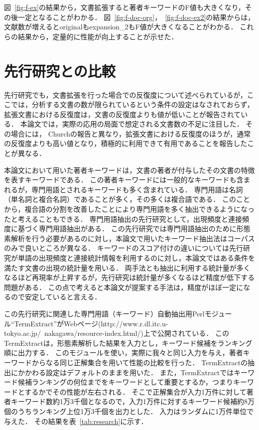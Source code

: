 \documentclass[japanese]{jnlp_1.2c}
\begin{document}
図~\ref{fig:f-ex}の結果から，文書拡張すると著者キーワードのF値も大きくなり，その後一定となることがわかる．
図~\ref{fig:f-doc-org}，~\ref{fig:f-doc-ex2}の結果からは，文献数が増えるとoriginalもexpansion\_2もF値が大きくなることがわかる．
これらの結果から，定量的に性能が向上することが示せた．

\section{先行研究との比較}
先行研究\cite{Church2000}でも，文書拡張を行った場合での反復度について述べられているが，ここでは，分析する文書の数が限られているという条件の設定はなされておらず，拡張文書における反復度は，文書の反復度よりも値が低いことが報告されている．
本論文では，実際の応用の局面で想定される文書数の不足に注目した．
その場合には， Churchの報告と異なり，拡張文書における反復度のほうが，通常の反復度よりも高い値となり，積極的に利用できて有用であることを報告したことが異なる．

本論文において用いた著者キーワードは，文書の著者が付与したその文書の特徴を表すキーワードである．
この著者キーワードには一般的なキーワードも含まれるが，専門用語とされるキーワードも多く含まれている．
専門用語は名詞（単名詞と複合名詞）であることが多く，その多くは複合語である．
このことから，複合語の分割を改善したことにより専門用語を多く抽出できるようになったと考えることもできる．
専門用語抽出の先行研究として，出現頻度と連接頻度に基づく専門用語抽出\cite{Nakagawa2003}がある．
この先行研究では専門用語抽出のために形態素解析を行う必要があるのに対し，本論文で用いたキーワード抽出法はコーパスのみで良いところが異なる．
キーワードのスコア付けの違いについては先行研究が単語の出現頻度と連接統計情報を利用するのに対し，本論文ではある条件を満たす文書の出現の統計量を用いる．
両手法とも抽出に利用する統計量が多くなるほど再現率が上昇するが，先行研究は統計量が多くなるほど精度が低下する問題がある．
この点で考えると本論文が提案する手法は，精度がほぼ一定になるので安定していると言える．

この先行研究\cite{Nakagawa2003}に関連した専門用語（キーワード）自動抽出用Perlモジュール“TermExtract”がWebページ(http://www.r.dl.itc.u-tokyo.ac.jp/~nakagawa/resource-index.html/)上で公開されている．
このTermExtractは，形態素解析した結果を入力とし，キーワード候補をランキング順に出力する．
このモジュールを使い，実際に我々と同じ入力を与え，著者キーワードからなる同じ正解集合を用いて性能の比較を行った．
TermExtractの抽出にかかわる設定はデフォルトのままを用いた．
また，TermExtractではキーワード候補ランキングの何位までをキーワードとして重要とするか，つまりキーワードとするかでその性能が左右される．
そこで正解集合が入力1万件に対して著者キーワード数約1万3千個となるので，入力1万件に対するキーワード候補約8万個のうちランキング上位1万3千個を出力とした．
入力はランダムに1万件単位で与えた．
その結果を表~\ref{tab:research}に示す．
\end{document}
